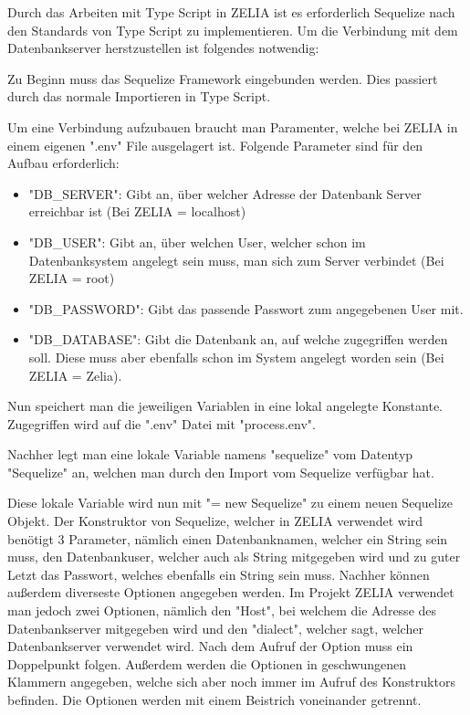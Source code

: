 
Durch das Arbeiten mit Type Script in ZELIA ist es erforderlich Sequelize nach den Standards von Type Script zu implementieren. Um die Verbindung mit dem Datenbankserver herstzustellen ist folgendes notwendig:

Zu Beginn muss das Sequelize Framework eingebunden werden. Dies passiert durch das normale Importieren in Type Script.


Um eine Verbindung aufzubauen braucht man Paramenter, welche bei ZELIA in einem eigenen ".env" File ausgelagert ist. Folgende Parameter sind für den Aufbau erforderlich:

\begin{itemize}
    \item "DB\_SERVER": Gibt an, über welcher Adresse der Datenbank Server erreichbar ist (Bei ZELIA = localhost)
    \item "DB\_USER": Gibt an, über welchen User, welcher schon im Datenbanksystem angelegt sein muss, man sich zum Server verbindet (Bei ZELIA = root)
    \item "DB\_PASSWORD": Gibt das passende Passwort zum angegebenen User mit.
    \item "DB\_DATABASE": Gibt die Datenbank an, auf welche zugegriffen werden soll. Diese muss aber ebenfalls schon im System angelegt worden sein (Bei ZELIA = Zelia).
\end{itemize}

Nun speichert man die jeweiligen Variablen in eine lokal angelegte Konstante. Zugegriffen wird auf die ".env" Datei mit "process.env".


Nachher legt man eine lokale Variable namens "sequelize" vom Datentyp "Sequelize" an, welchen man durch den Import vom Sequelize verfügbar hat.


Diese lokale Variable wird nun mit "= new Sequelize" zu einem neuen Sequelize Objekt. Der Konstruktor von Sequelize, welcher in ZELIA verwendet wird benötigt 3 Parameter, nämlich einen Datenbanknamen, welcher ein String sein muss, den Datenbankuser, welcher auch als String mitgegeben wird und zu guter Letzt das Passwort, welches ebenfalls ein String sein muss. Nachher können außerdem diverseste Optionen angegeben werden. Im Projekt ZELIA verwendet man jedoch zwei Optionen, nämlich den "Host", bei welchem die Adresse des Datenbankserver mitgegeben wird und den "dialect", welcher sagt, welcher Datenbankserver verwendet wird. Nach dem Aufruf der Option muss ein Doppelpunkt folgen. Außerdem werden die Optionen in geschwungenen Klammern angegeben, welche sich aber noch immer im Aufruf des Konstruktors befinden. Die Optionen werden mit einem Beistrich voneinander getrennt.

